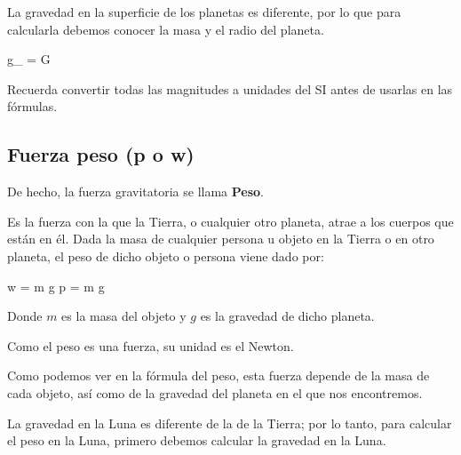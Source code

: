 \begin{remark}
    La gravedad en la superficie de los planetas es diferente, por lo que para calcularla debemos conocer la masa y el radio del planeta.
\end{remark}

\newpage

\begin{centeredequation}
    g_{} = G \cdot {}
\end{centeredequation}

\begin{remark}
    Recuerda convertir todas las magnitudes a unidades del SI antes de usarlas en las fórmulas.
\end{remark}

\subsection{Fuerza peso (p o w)}

De hecho, la fuerza gravitatoria se llama \textbf{Peso}.

\begin{definition}
    Es la fuerza con la que la Tierra, o cualquier otro planeta, atrae a los cuerpos que están en él.
    Dada la masa de cualquier persona u objeto en la Tierra o en otro planeta, el peso de dicho objeto o persona viene dado por:
    \begin{centeredequation}
        w = m \cdot g \quad {} \quad p = m \cdot g
    \end{centeredequation}
    Donde \( m \) es la masa del objeto y \( g \) es la gravedad de dicho planeta.
\end{definition}

Como el peso es una fuerza, su unidad es el Newton.

Como podemos ver en la fórmula del peso, esta fuerza depende de la masa de cada objeto, así como de la gravedad del planeta en el que nos encontremos.

\begin{remark}
    La gravedad en la Luna es diferente de la de la Tierra; por lo tanto, para calcular el peso en la Luna, primero debemos calcular la gravedad en la Luna.
\end{remark}

